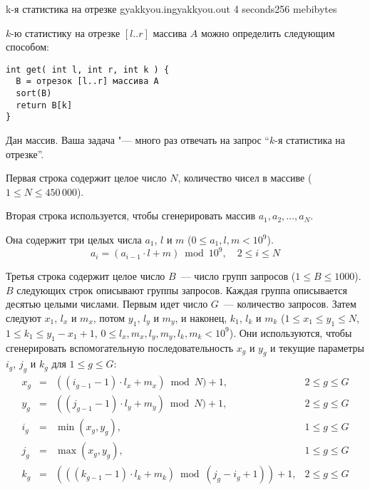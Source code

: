 \begin{problem}{k-я статистика на отрезке}
{gyakkyou.in}{gyakkyou.out}
{4 seconds}{256 mebibytes}

\noindent{}$k$-ю статистику на отрезке $[l..r]$ массива $A$ можно определить следующим способом:

\vspace*{-0.5em}
\begin{verbatim}
int get( int l, int r, int k ) {
  B = отрезок [l..r] массива A
  sort(B)
  return B[k]
}
\end{verbatim}
\vspace*{-0.4em}
Дан массив. Ваша задача "--- много раз отвечать на запрос ``$k$-я статистика на отрезке''.

\InputFile

Первая строка содержит целое число $N$, количество чисел в массиве ($1 \le N \le 450\,000$).

Вторая строка используется, чтобы сгенерировать массив $a_1, a_2, \dots, a_N$.

Она содержит три целых числа $a_1$, $l$ и $m$ ($0 \le a_1, l, m < 10^9$).
\vspace*{-0.2em}
$$a_i = (a_{i-1} \cdot l + m) \bmod 10^9, \quad 2 \le i \le N$$
\vspace*{-1.1em}

Третья строка содержит целое число $B$~--- число групп запросов ($1 \le B \le 1000$).
$B$ следующих строк описывают группы запросов.
Каждая группа описывается десятью целыми числами.
Первым идет число $G$~--- количество запросов.
Затем следуют $x_1$, $l_x$ и $m_x$, потом $y_1$, $l_y$ и $m_y$, и наконец, $k_1$, $l_k$ и $m_k$ 
($1 \le x_1 \le y_1 \le N$, $1 \le k_1 \le y_1 - x_1 + 1$, $0 \le l_x, m_x, l_y, m_y, l_k, m_k < 10^9$).
Они используются, чтобы сгенерировать вспомогательную последовательность $x_g$ и $y_g$ и текущие параметры $i_g$, $j_g$ и $k_g$ для $1 \le g \le G$:
\vspace*{-0.2em}
$$
\begin{array}{ccll}
x_g & = & ((i_{g - 1} - 1) \cdot l_x + m_x) \bmod N) + 1, & 2 \le g \le G \\
y_g & = & ((j_{g - 1} - 1) \cdot l_y + m_y) \bmod N) + 1, & 2 \le g \le G \\
i_g & = & \min(x_g, y_g), & 1 \le g \le G \\
j_g & = & \max(x_g, y_g), & 1 \le g \le G \\
k_g & = & (((k_{g - 1} - 1) \cdot l_k + m_k) \bmod (j_g - i_g + 1)) + 1,
& 2 \le g \le G \\
\end{array}
$$
\vspace*{-0.7em}


\end{problem}
